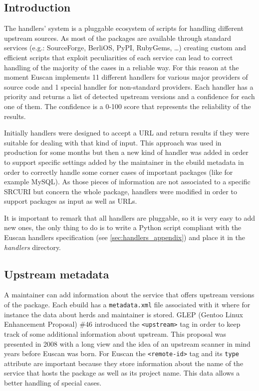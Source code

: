 \subsection{Introduction}
The handlers' system is a pluggable ecosystem of scripts for handling different upstream sources. As most of the packages are available through standard services (e.g.: SourceForge, BerliOS, PyPI, RubyGems, \ldots) creating custom and efficient scripts that exploit peculiarities of each service can lead to correct handling of the majority of the cases in a reliable way. For this reason at the moment Euscan implements 11 different handlers for various major providers of source code and 1 special handler for non-standard providers.
Each handler has a priority and returns a list of detected upstream versions and a confidence for each one of them. The confidence is a 0-100 score that represents the reliability of the results.

Initially handlers were designed to accept a URL and return results if they were suitable for dealing with that kind of input. This approach was used in production for some months but then a new kind of handler was added in order to support specific settings added by the maintainer in the ebuild metadata in order to correctly handle some corner cases of important packages (like for example MySQL). As those pieces of information are not associated to a specific SRC\textunderscore URI but concern the whole package, handlers were modified in order to support packages as input as well as URLs.

It is important to remark that all handlers are pluggable, so it is very easy to add new ones, the only thing to do is to write a Python script compliant with the Euscan handlers specification (see \ref{sec:handlers_appendix}) and place it in the \emph{handlers} directory.


\subsection{Upstream metadata}
A maintainer can add information about the service that offers upstream versions of the package. Each ebuild has a \texttt{metadata.xml} file associated with it where for instance the data about herds and maintainer is stored. GLEP (Gentoo Linux Enhancement Proposal) \#46 \cite{glep46} introduced the \texttt{<upstream>} tag in order to keep track of some additional information about upstream. This proposal was presented in 2008 with a long view and the idea of an upstream scanner in mind years before Euscan was born.
For Euscan the \texttt{<remote-id>} tag and its \texttt{type} attribute are important because they store information about the name of the service that hosts the package as well as its project name. This data allows a better handling of special cases.

